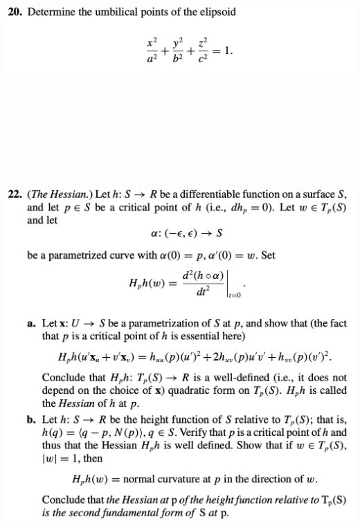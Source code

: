 \documentclass{report}
\begin{document}
\begin{question}{}{}
\includegraphics[height=5cm,width=18cm]{hw5q10}
\end{question}
\begin{question}{}{}
\includegraphics[height=18cm,width=18cm]{hw5q11}
\end{question}
\end{document}
